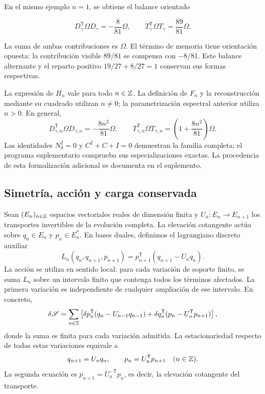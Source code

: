 En el mismo ejemplo \(n=1\), se obtiene el balance orientado



\begin{equation}
D_\gamma^{\mathsf T}\Omega D_\gamma=-\frac8{81}\Omega,
\qquad
T_\gamma^{\mathsf T}\Omega T_\gamma=\frac{89}{81}\Omega.
\label{nuc11:eq:33}
\end{equation}



La suma de ambas contribuciones es \(\Omega\).
El término de memoria tiene orientación opuesta:
la contribución visible \(89/81\) se compensa con \(-8/81\).
Este balance alternante y el reparto positivo
\(19/27+8/27=1\) conservan sus formas respectivas.

La expresión de \(H_n\) vale para todo \(n\in\mathbb Z\).
La definición de \(F_n\) y la reconstrucción mediante su cuadrado
utilizan \(n\ne0\); la parametrización espectral anterior utiliza
\(n>0\).
En general,
\[
 D_{\gamma,n}^{\mathsf T}\Omega D_{\gamma,n}
 =-\frac{8n^2}{81}\Omega,\qquad
 T_{\gamma,n}^{\mathsf T}\Omega T_{\gamma,n}
 =\left(1+\frac{8n^2}{81}\right)\Omega.
\]
Las identidades \(N_0^2=0\) y \(C^2+C+I=0\) demuestran la
familia completa; el programa suplementario comprueba sus
especializaciones exactas.
La procedencia de esta formalización adicional se documenta
en el suplemento.

\subsection{Simetría, acción y carga conservada}

Sean \((E_n)_{n\in\mathbb Z}\) espacios vectoriales reales de dimensión
finita y \(U_n:E_n\to E_{n+1}\) los transportes invertibles de
la evolución completa.
La elevación cotangente actúa sobre
\(q_n\in E_n\) y \(p_n\in E_n^*\).
En bases duales, definimos el lagrangiano discreto auxiliar
\[
 L_n(q_n,q_{n+1},p_{n+1})
 =p_{n+1}^{\mathsf T}(q_{n+1}-U_nq_n).
\]
La acción se utiliza en sentido local:
para cada variación de soporte finito, se suma \(L_n\) sobre un
intervalo finito que contenga todos los términos afectados.
La primera variación es independiente de cualquier ampliación
de ese intervalo. En concreto,
\begin{equation}
 \delta\mathscr S
 =\sum_{n\in\mathbb Z}
 \left[
  \delta p_n^{\mathsf T}(q_n-U_{n-1}q_{n-1})
  +\delta q_n^{\mathsf T}(p_n-U_n^{\mathsf T}p_{n+1})
 \right],
 \label{nuc11:accion-local}
\end{equation}
donde la suma es finita para cada variación admitida.
La estacionariedad respecto de todas estas variaciones equivale a
\[
 q_{n+1}=U_nq_n,\qquad
 p_n=U_n^{\mathsf T}p_{n+1}
 \quad(n\in\mathbb Z).
\]
La segunda ecuación es
\(p_{n+1}=U_n^{-\mathsf T}p_n\), es decir, la elevación
cotangente del transporte.

